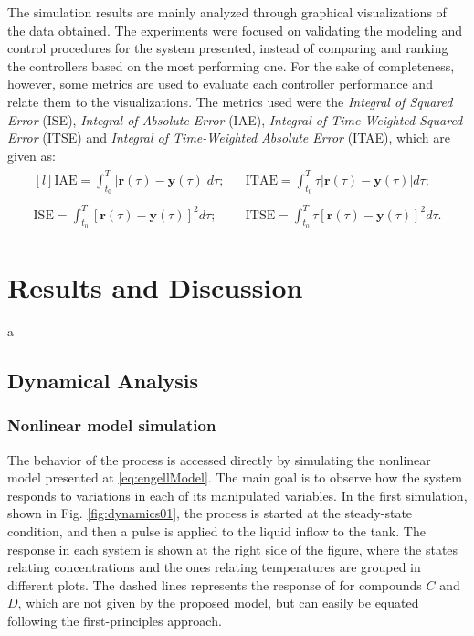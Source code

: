\documentclass[a4paper,11pt]{book}
\numberwithin{figure}{chapter}
\numberwithin{equation}{chapter}
\numberwithin{table}{chapter}
\theoremstyle{definition}
\begin{document}
The simulation results are mainly analyzed through graphical visualizations of the data obtained. The experiments were focused on validating the modeling and control procedures for the system presented, instead of comparing and ranking the controllers based on the most performing one. For the sake of completeness, however, some metrics are used to evaluate each controller performance and relate them to the visualizations. The metrics used were the \textit{Integral of Squared Error} (ISE), \textit{Integral of Absolute Error} (IAE), \textit{Integral of Time-Weighted Squared Error} (ITSE) and \textit{Integral of Time-Weighted Absolute Error} (ITAE), which are given as:
\begin{align}
\begin{matrix*}[l] \displaystyle
	\text{IAE} = \displaystyle\int_{t_0}^{T} | \bm{r}(\tau) - \bm{y}(\tau) | d\tau; & & \text{ITAE} = \displaystyle\int_{t_0}^{T} \tau | \bm{r}(\tau) - \bm{y}(\tau) | d\tau;\\ \\
	\text{ISE} = \displaystyle\int_{t_0}^{T} \left[ \bm{r}(\tau) - \bm{y}(\tau) \right]^2 d\tau; & & \text{ITSE} = \displaystyle\int_{t_0}^{T} \tau \left[ \bm{r}(\tau) - \bm{y}(\tau) \right]^2 d\tau.
\end{matrix*}
\end{align}


\clearpage
\chapter{Results and Discussion}

a

\section{Dynamical Analysis}

\subsection{Nonlinear model simulation}

The behavior of the process is accessed directly by simulating the nonlinear model presented at \eqref{eq:engellModel}. The main goal is to observe how the system responds to variations in each of its manipulated variables. In the first simulation, shown in Fig. \ref{fig:dynamics01}, the process is started at the steady-state condition, and then a pulse is applied to the liquid inflow to the tank. The response in each system is shown at the right side of the figure, where the states relating concentrations and the ones relating temperatures are grouped in different plots. The dashed lines represents the response of for compounds $C$ and $D$, which are not given by the proposed model, but can easily be equated following the first-principles approach.
\end{document}

